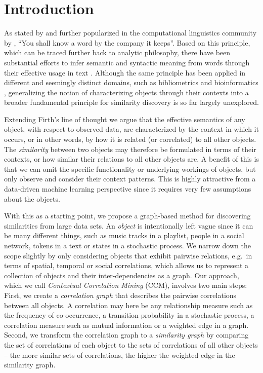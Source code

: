 \documentclass{kais}
\begin{document}
\section{Introduction}
\label{sec:introduction}

As stated by  and further popularized in the computational linguistics community by , 
``You shall know a word by the company it keeps''. Based on this principle, which can be 
traced further back to analytic philosophy, there have been substantial efforts to infer semantic and syntactic meaning
 from words through their effective usage in text \cite{Harispe2015}. Although the same principle has been applied in 
 different and seemingly distinct domains, such as bibliometrics  \cite{Kessler1963} and bioinformatics 
 \cite{ravasz2002hierarchical}, generalizing the notion of characterizing objects through 
their contexts into a broader fundamental principle for similarity discovery is so far largely unexplored.

Extending Firth's line of thought we argue that the effective semantics of any object, with respect to observed data, are characterized 
by the context in which it occurs, or in other words, by how it is related (or correlated) to all other objects. The \emph{similarity} 
between two objects may therefore be formulated in terms of their contexts, or how similar their relations to all other
objects are.
A benefit of this is that we can omit the specific functionality or underlying workings of objects, but
only observe and consider their context patterns. This is highly attractive from a data-driven machine learning
perspective since it requires very few assumptions about the objects.

With this as a starting point, we propose a graph-based method for discovering similarities from large data
sets. An \emph{object} is intentionally left vague since it can be many different things, such as
music tracks in a playlist, people in a social network, tokens in a text or states in a stochastic process. We narrow down the scope
slightly by only considering objects that exhibit pairwise relations, e.g.\ in terms of spatial, temporal or social
correlations, which allows us to represent a collection of objects and their inter-dependencies as a graph. Our
approach, which we call \emph{Contextual Correlation Mining} (CCM), involves two main steps: First, we create a \emph{correlation graph} 
that describes the pairwise correlations between all objects. A correlation may here be any relationship measure such as the frequency 
of co-occurrence, a transition probability in a stochastic process, a correlation measure such as mutual information or a weighted edge in a graph. 
Second, we transform the correlation graph to a \emph{similarity graph} by comparing the set of correlations of each object
to the sets of correlations of all other objects -- the more similar sets of correlations, the higher the weighted edge in the
similarity graph.
\end{document}
